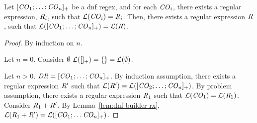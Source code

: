 \begin{lemma}
\label{lem:dnf-rx}
Let $[\mathit{CO}_1;\ldots;\mathit{CO}_n]_{+}$ be a dnf regex,
and for each $\mathit{CO}_i$, there exists a regular expression, $\mathit{R}_i$,
such that $\mathcal{L}(\mathit{CO}_i)=\mathit{R}_i$.
Then, there exists a regular expression $\mathit{R}$, such that
$\mathcal{L}([\mathit{CO}_1;
\ldots;\mathit{CO}_n]_{+})=\mathcal{L}(\mathit{R})$.
\end{lemma}
\begin{proof}
By induction on $n$.

Let $n=0$.  Consider $\emptyset$
$\mathcal{L}([]_{+})=\{\}=\mathcal{L}(\emptyset)$.

Let $n>0$.
$\mathit{DR}=[\mathit{CO}_1;\ldots;\mathit{CO}_n]_{+}$.
By induction assumption, there exists a regular expression $\mathit{R}'$ such that
$\mathcal{L}(\mathit{R}')=
\mathcal{L}([\mathit{CO}_2;\ldots;\mathit{CO}_n]_{+})$.
By problem assumption, there exists a regular expression $\mathit{R}_1$ such that
$\mathcal{L}(\mathit{CO}_1)=\mathcal{L}(\mathit{R}_1)$.
Consider $\mathit{R}_1+\mathit{R}'$.
By Lemma~\ref{lem:dnf-builder-rx},
$\mathcal{L}(\mathit{R}_1+\mathit{R}')=
\mathcal{L}([\mathit{CO}_1;
\ldots\mathit{CO}_n]_{+})$.
\end{proof}
